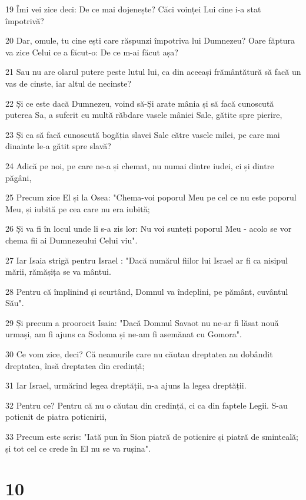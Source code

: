 \par 19 Îmi vei zice deci: De ce mai dojenește? Căci voinței Lui cine i-a stat împotrivă?
\par 20 Dar, omule, tu cine ești care răspunzi împotriva lui Dumnezeu? Oare făptura va zice Celui ce a făcut-o: De ce m-ai făcut așa?
\par 21 Sau nu are olarul putere peste lutul lui, ca din aceeași frământătură să facă un vas de cinste, iar altul de necinste?
\par 22 Și ce este dacă Dumnezeu, voind să-Și arate mânia și să facă cunoscută puterea Sa, a suferit cu multă răbdare vasele mâniei Sale, gătite spre pierire,
\par 23 Și ca să facă cunoscută bogăția slavei Sale către vasele milei, pe care mai dinainte le-a gătit spre slavă?
\par 24 Adică pe noi, pe care ne-a și chemat, nu numai dintre iudei, ci și dintre păgâni,
\par 25 Precum zice El și la Osea: "Chema-voi poporul Meu pe cel ce nu este poporul Meu, și iubită pe cea care nu era iubită;
\par 26 Și va fi în locul unde li s-a zis lor: Nu voi sunteți poporul Meu - acolo se vor chema fii ai Dumnezeului Celui viu".
\par 27 Iar Isaia strigă pentru Israel : "Dacă numărul fiilor lui Israel ar fi ca nisipul mării, rămășița se va mântui.
\par 28 Pentru că împlinind și scurtând, Domnul va îndeplini, pe pământ, cuvântul Său".
\par 29 Și precum a proorocit Isaia: "Dacă Domnul Savaot nu ne-ar fi lăsat nouă urmași, am fi ajuns ca Sodoma și ne-am fi asemănat cu Gomora".
\par 30 Ce vom zice, deci? Că neamurile care nu căutau dreptatea au dobândit dreptatea, însă dreptatea din credință;
\par 31 Iar Israel, urmărind legea dreptății, n-a ajuns la legea dreptății.
\par 32 Pentru ce? Pentru că nu o căutau din credință, ci ca din faptele Legii. S-au poticnit de piatra poticnirii,
\par 33 Precum este scris: "Iată pun în Sion piatră de poticnire și piatră de sminteală; și tot cel ce crede în El nu se va rușina".

\chapter{10}

